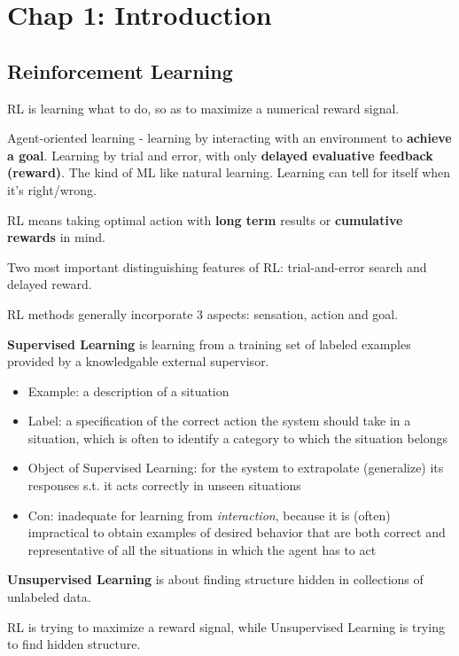 \documentclass[sutton_barto_notes.tex]{subfiles}
\begin{document}
\newpage

\section{Chap 1: Introduction}
\subsection{Reinforcement Learning}

RL is learning what to do, so as to maximize a numerical reward signal.

Agent-oriented learning - learning by interacting with an environment to \textbf{achieve a goal}. Learning by trial and error, with only \textbf{delayed evaluative feedback (reward)}. The kind of ML like natural learning. Learning can tell for itself when it's right/wrong.

RL means taking optimal action with \textbf{long term} results or \textbf{cumulative rewards} in mind.

Two most important distinguishing features of RL: trial-and-error search and delayed reward.

RL methods generally incorporate 3 aspects: sensation, action and goal.

\begin{definition}
\textbf{Supervised Learning} is learning from a training set of labeled examples provided by a knowledgable external supervisor.
\end{definition}

\begin{itemize}
	\item Example: a description of a situation
	\item Label: a specification of the correct action the system should take in a situation, which is often to identify a category to which the situation belongs
	\item Object of Supervised Learning: for the system to extrapolate (generalize) its responses s.t. it acts correctly in unseen situations
	\item Con: inadequate for learning from \textit{interaction}, because it is (often) impractical to obtain examples of desired behavior that are both correct and representative of all the situations in which the agent has to act
\end{itemize}

\begin{definition}
\textbf{Unsupervised Learning} is about finding structure hidden in collections of unlabeled data.
\end{definition}
RL is trying to maximize a reward signal, while Unsupervised Learning is trying to find hidden structure.
\end{document}
